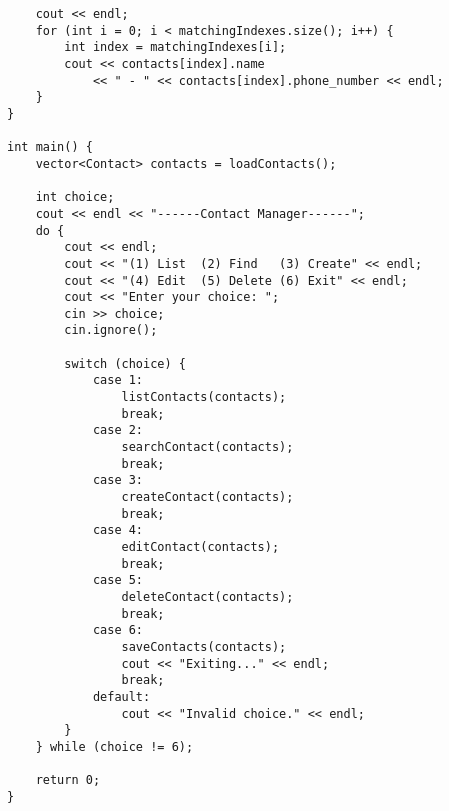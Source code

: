 \documentclass[12pt, a4paper]{article}
\begin{document}
\begin{verbatim}
	cout << endl;
	for (int i = 0; i < matchingIndexes.size(); i++) {
		int index = matchingIndexes[i];
		cout << contacts[index].name
			<< " - " << contacts[index].phone_number << endl;
	}
}

int main() {
	vector<Contact> contacts = loadContacts();

	int choice;
	cout << endl << "------Contact Manager------";
	do {
		cout << endl;
		cout << "(1) List  (2) Find   (3) Create" << endl;
		cout << "(4) Edit  (5) Delete (6) Exit" << endl;
		cout << "Enter your choice: ";
		cin >> choice;
		cin.ignore();
		
		switch (choice) {
			case 1:
				listContacts(contacts);
				break;
			case 2:
				searchContact(contacts);
				break;
			case 3:
				createContact(contacts);
				break;
			case 4:
				editContact(contacts);
				break;
			case 5:
				deleteContact(contacts);
				break;
			case 6:
				saveContacts(contacts);
				cout << "Exiting..." << endl;
				break;
			default:
				cout << "Invalid choice." << endl;
		}
	} while (choice != 6);

	return 0;
}
\end{verbatim}

\vspace*{.8cm}


\vspace*{.3cm}
\end{document}
